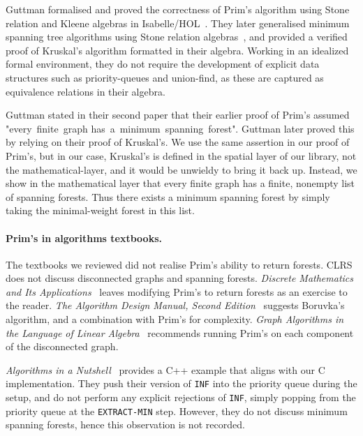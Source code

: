 Guttman formalised and proved the correctness of Prim's algorithm using Stone relation and Kleene algebras in Isabelle/HOL~\cite{DBLP:conf/ictac/Guttmann16}. They later generalised minimum spanning tree algorithms using Stone relation algebras~\cite{DBLP:journals/jlp/Guttmann18}, and provided a verified proof of Kruskal's algorithm formatted in their algebra. Working in an idealized formal environment, they do not require the development of explicit data structures such as priority-queues and union-find, as these are captured as equivalence relations in their algebra.

Guttman stated in their second paper that their earlier proof of Prim's assumed "every~finite~graph has~a~minimum~spanning~forest". Guttman later proved this by relying on their proof of Kruskal's. We use the same assertion in our proof of Prim's, but in our case, Kruskal's is defined in the spatial layer of our library, not the mathematical-layer, and it would be unwieldy to bring it back up. Instead, we show in the mathematical layer that every finite graph has a finite, nonempty list of spanning forests. Thus there exists a minimum spanning forest by simply taking the minimal-weight forest in this list.

\paragraph{Prim's in algorithms textbooks.} The textbooks we reviewed did not realise Prim's ability to return forests. CLRS does not discuss disconnected graphs and spanning forests. \textit{Discrete Mathematics and Its Applications}~\cite{rozen} leaves modifying Prim's to return forests as an exercise to the reader. \textit{The Algorithm Design Manual, Second Edition}~\cite{DBLP:books/daglib/0022194} suggests Boruvka’s algorithm, and a combination with Prim's for complexity. \textit{Graph Algorithms in the Language of Linear Algebra}~\cite{kepnergilbert} recommends running Prim's on each component of the disconnected graph.

\textit{Algorithms in a Nutshell}~\cite{heineman2008algorithms} provides a C++ example that aligns with our C implementation. They push their version of \texttt{INF} into the priority queue during the setup, and do not perform any explicit rejections of \texttt{INF}, simply popping from the priority queue at the \texttt{EXTRACT-MIN} step. However, they do not discuss minimum spanning forests, hence this observation is not recorded.

